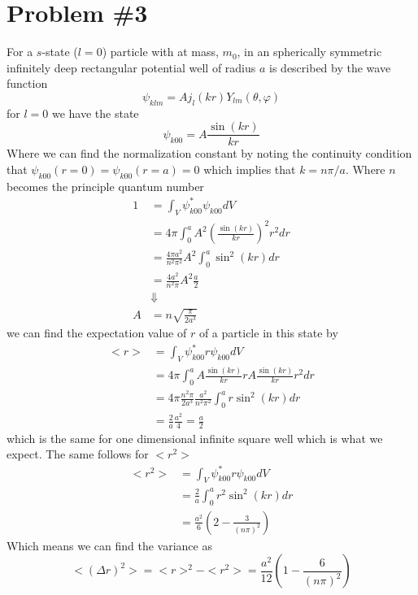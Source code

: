 \documentclass[11pt]{article}
\numberwithin{equation}{section}
\begin{document}
\section{Problem \#3}
For a $s$-state ($l=0$) particle with at mass, $m_0$, in an spherically symmetric infinitely
deep rectangular potential well of radius $a$ is described by the wave function
$$\psi_{klm} = Aj_{l}(kr)Y_{lm}(\theta,\varphi)$$
for $l=0$ we have the state
$$\psi_{k00} = A\frac{\sin(kr)}{kr}$$
Where we can find the normalization constant by noting the continuity condition that 
$\psi_{k00}(r=0) = \psi_{k00}(r=a) = 0$ which implies that $k= n\pi/a$. Where $n$ becomes
the principle quantum number
\begin{align*}
1 &= \int_{V}\psi^*_{k00}\psi_{k00}dV\\
&= 4\pi\int_{0}^{a}A^2\left(\frac{\sin(kr)}{kr}\right)^2r^2dr\\
&= \frac{4\pi{a^2}}{n^2\pi^2}A^2\int_{0}^{a}\sin^2(kr)dr\\
&= \frac{4a^2}{n^2\pi}A^2\frac{a}{2}\\
&\Downarrow\\
A &= n\sqrt{\frac{\pi}{2a^3}}
\end{align*}
we can find the expectation value of $r$ of a particle in this state by
\begin{align*}
<r> &= \int_{V}\psi_{k00}^*r\psi_{k00}dV\\
&= 4\pi\int_{0}^{a}A\frac{\sin(kr)}{kr}rA\frac{\sin(kr)}{kr}r^2dr\\
&= 4\pi\frac{n^2\pi}{2a^3}\frac{a^2}{n^2\pi^2}\int_{0}^{a}r\sin^2(kr)dr\\
&= \frac{2}{a}\frac{a^2}{4} = \frac{a}{2}
\end{align*}
which is the same for one dimensional infinite square well which is what we expect. The same
follows for $<r^2>$
\begin{align*}
<r^2> &= \int_{V}\psi_{k00}^*r\psi_{k00}dV\\
&= \frac{2}{a}\int_{0}^{a}r^2\sin^2(kr)dr\\
&= \frac{a^2}{6}\left(2-\frac{3}{(n\pi)^2}\right)
\end{align*}
Which means we can find the variance as
$$<(\Delta{r})^2> = <r>^2 - <r^2> = \frac{a^2}{12}\left(1-\frac{6}{(n\pi)^2}\right)$$

\pagebreak
\end{document}
